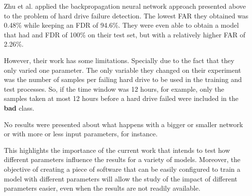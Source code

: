 Zhu et al. applied the backpropagation neural network approach presented above to the problem of hard drive failure detection.
The lowest FAR they obtained was 0.48\% while keeping an FDR of 94.6\%.
They were even able to obtain a model that had and FDR of 100\% on their test set, but with a relatively higher FAR of 2.26\%.

However, their work has some limitations.
Specially due to the fact that they only varied one parameter.
The only variable they changed on their experiment was the number of samples per failing hard drive to be used in the training and test processes.
So, if the time window was 12 hours, for example, only the samples taken at most 12 hours before a hard drive failed were included in the \textbf{bad} class.

No results were presented about what happens with a bigger or smaller network or with more or less input parameters, for instance.

This highlights the importance of the current work that intends to test how different parameters influence the results for a variety of models.
Moreover, the objective of creating a piece of software that can be easily configured to train a model with different parameters will allow the study of the impact of different parameters easier, even when the results are not readily available. 





